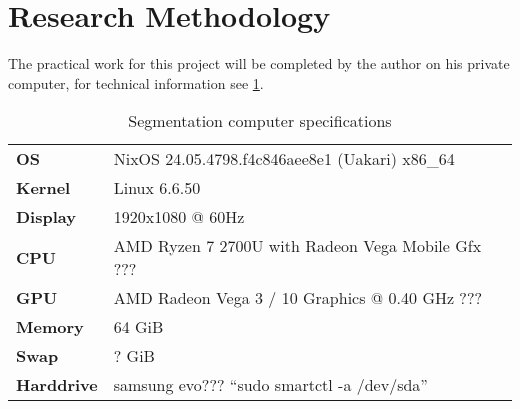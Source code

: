 

\section{Research Methodology}
\label{s:introduction-researchmethodology}
The practical work for this project will be completed by the author on his private computer, for technical information see \cref{t:computer-specs}.
\begin{table}[ht]
	\label{t:computer-specs}
	\caption{Segmentation computer specifications}
	\begin{center}
		\begin{tabular}{l l}
			\textbf{OS}        & NixOS 24.05.4798.f4c846aee8e1 (Uakari) x86\_64    \\
			\textbf{Kernel}    & Linux 6.6.50                                      \\
			\textbf{Display}   & 1920x1080 @ 60Hz                                  \\
			\textbf{CPU}       & AMD Ryzen 7 2700U with Radeon Vega Mobile Gfx ??? \\
			\textbf{GPU}       & AMD Radeon Vega 3 / 10 Graphics @ 0.40 GHz ???    \\
			\textbf{Memory}    & 64 GiB                                            \\
			\textbf{Swap}      & ? GiB                                             \\
			\textbf{Harddrive} & samsung evo??? ``sudo smartctl -a /dev/sda''
		\end{tabular}
	\end{center}
\end{table}

